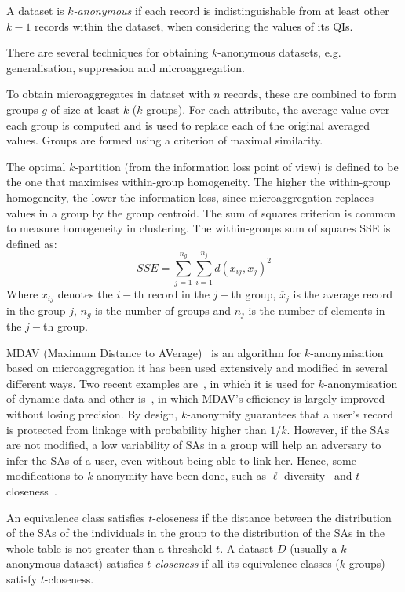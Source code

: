 \documentclass[runningheads]{llncs}
\begin{document}
\begin{definition}[$k$-Anonymity]
A dataset is \emph{$k$-anonymous} if each record is indistinguishable from at least other $k - 1$ records within the dataset, when considering the values of its QIs. 
\end{definition}

There are several techniques for obtaining $k$-anonymous datasets, e.g. generalisation, suppression and microaggregation.

\begin{definition}[Microaggregation]
To obtain microaggregates in dataset with $n$ records, these are combined to form groups $g$ of size at least $k$ ($k$-groups). For each attribute, the average value over each group is computed and is used to replace each of the original averaged values. Groups are formed using a criterion of maximal similarity.
\end{definition}

The optimal $k$-partition (from the information loss point of view) is defined to be the one that maximises within-group homogeneity. The higher the within-group homogeneity, the lower the information loss, since microaggregation replaces values in a group by the group centroid. The sum of squares criterion is common to measure homogeneity in clustering. The within-groups sum of squares SSE is defined as:
$$SSE= \displaystyle\sum_{j=1}^{n_g}\sum_{i=1}^{n_j}d(x_{ij},\overline{x}_j)^2$$
Where $x_{ij}$ denotes the $i-$th record in the $j-$th group, $\overline{x}_j$ is the average record in the group $j$, $n_g$ is the number of groups and $n_j$ is the number of elements in the $j-$th group.

MDAV (Maximum Distance to AVerage)~\cite{Domingo:2005} is an algorithm for $k$-anonymisation based on microaggregation it has been used extensively and modified in several different ways. Two recent examples are~\cite{Salas:2018-b}, in which it is used for $k$-anonymisation of dynamic data and other is~\cite{Rodriguez:2020}, in which MDAV's efficiency is largely improved without losing precision. By design, $k$-anonymity guarantees that a user's record is protected from linkage with probability higher than $1/k$. However, if the SAs are not modified, a low variability of SAs in a group will help an adversary to infer the SAs of a user, even without being able to link her. 
Hence, some modifications to $k$-anonymity have been done, such as $\ell$-diversity~\cite{Machanavajjhala:2006} and $t$-closeness~\cite{Li:2007}. 

\begin{definition}[$t$-Closeness]
An equivalence class satisfies $t$-closeness if the distance between the distribution of the SAs of the individuals in the group to the distribution of the SAs in the whole table is not greater than a threshold $t$.
A dataset $D$ (usually a $k$-anonymous dataset) satisfies \emph{$t$-closeness} if all its equivalence classes ($k$-groups) satisfy $t$-closeness.
\end{definition}
\end{document}
